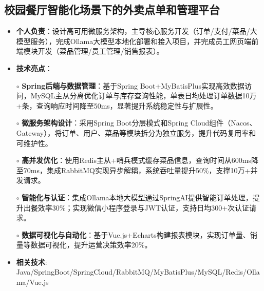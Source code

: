 \subsection{\textbf{校园餐厅智能化场景下的外卖点单和管理平台} \hspace{2cm}{2025.01 -- 2025.04}}
    \begin{normalsize}
      \begin{itemize}
        \item \textbf{个人负责}：设计高可用微服务架构，主导核心服务开发（订单/支付/菜品/大模型服务），完成Ollama大模型本地化部署和接入项目，并完成员工网页端前端模块开发（菜品管理/员工管理/销售报表）。
        \item \textbf{技术亮点}：
        \setlength{\itemindent}{1em} %
          \item[$\circ$] \textbf{Spring后端与数据管理}：基于Spring Boot+MyBatisPlus实现高效数据访问，MySQL主从分离优化订单与库存查询性能，单表日均处理订单数据10万+条，查询响应时间降至50ms，显著提升系统稳定性与扩展性。
          \item[$\circ$] \textbf{微服务架构设计}：采用Spring Boot分层模式和Spring Cloud组件（Nacos、Gateway），将订单、用户、菜品等模块拆分为独立服务，提升代码复用率和可维护性。
          \item[$\circ$] \textbf{高并发优化}：使用Redis主从+哨兵模式缓存菜品信息，查询时间从600ms降至70ms，集成RabbitMQ实现异步解耦，系统吞吐量提升50\%，支撑10万+并发请求。
          \item[$\circ$] \textbf{智能化与认证}：集成Ollama本地大模型通过SpringAI提供智能订单处理，提升出餐效率30\%；实现微信小程序登录与JWT认证，支持日均300+次认证请求。
          \item[$\circ$] \textbf{数据可视化与自动化}：基于Vue.js+Echarts构建报表模块，实现订单量、销量等数据可视化，提升运营决策效率20\%。
        \setlength{\itemindent}{0em} %
        \item \textbf{相关技术}: Java/SpringBoot/SpringCloud/RabbitMQ/MyBatisPlus/MySQL/Redis/Ollama/Vue.js
        \end{itemize}
    \end{normalsize}
